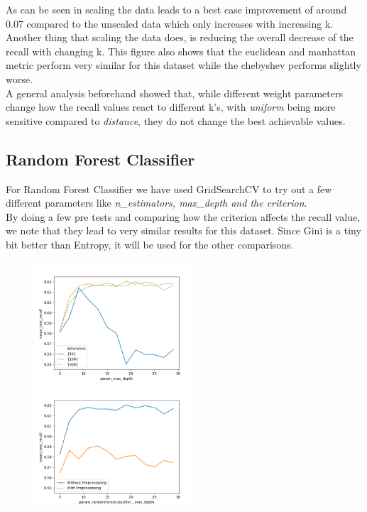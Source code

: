 As can be seen in  scaling the data leads to a best case improvement of around 0.07 compared to the unscaled data which only increases with increasing k. Another thing that scaling the data does, is reducing the overall decrease of the recall with changing k. This figure also shows that the euclidean and manhattan metric perform very similar for this dataset while the chebyshev performs slightly worse. \\
\newline
A general analysis beforehand showed that, while different weight parameters change how the recall values react to different k's, with \textit{uniform} being more sensitive compared to  \textit{distance}, they do not change the best achievable values.
\subsection{Random Forest Classifier}
For Random Forest Classifier we have used GridSearchCV to try out a few different parameters like \textit{n\_estimators, max\_depth and the criterion}. \\
\newline
By doing a few pre tests and comparing how the criterion affects the recall value, we note that they lead to very similar results for this dataset. Since Gini is a tiny bit better than Entropy, it will be used for the other comparisons. \\
\newline

\begin{figure}
\begin{floatrow}
    {\includegraphics[width=6cm]{onlineshop/plots/rfc_n_estimators_comparison.png}\label{fig:rf_n_estim}}
    {\includegraphics[width=6cm]{onlineshop/plots/rfc_preprocessing_comparison.png}\label{fig:rfc_pre}}
\end{floatrow}
\end{figure}

